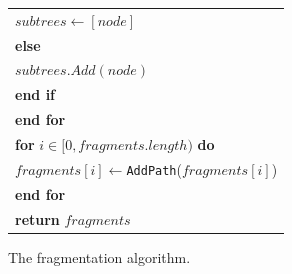\begin{figure}[]
\begin{tabular}{l}
		\makebox[1em][r]{12:}\hspace{9 mm} $subtrees \leftarrow [node]$ \\
		\makebox[1em][r]{13:}\hspace{5 mm}  \textbf{else}\\
		\makebox[1em][r]{14:}\hspace{9 mm} $\mathit{subtrees}.Add(node)$ \\
		\makebox[1em][r]{15:}\hspace{5 mm}  \textbf{end if}\\
		\makebox[1em][r]{16:}\hspace{1 mm}  \textbf{end for}\\
		\makebox[1em][r]{17:}\hspace{1 mm}  \textbf{for} $i \in [0, \mathit{fragments}.length)$ \textbf{do}\\
		\makebox[1em][r]{18:}\hspace{5 mm}  $\mathit{fragments}[i] \leftarrow $\texttt{AddPath}($\mathit{fragments}[i]$)  \\
		\makebox[1em][r]{19:}\hspace{1 mm}  \textbf{end for}\\
		\makebox[1em][r]{20:}\hspace{1 mm}  \textbf{return} $\mathit{fragments}$\\
		\hline
	\end{tabular}
	\caption{The fragmentation algorithm.}
	\label{fig:algQuery1}
\end{figure}


